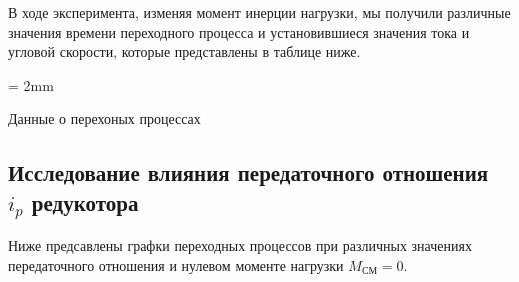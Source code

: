 \documentclass[a4paper, 12pt]{article}
\begin{document}
	\newpage
	В ходе эксперимента, изменяя момент инерции нагрузки, мы получили различные значения времени переходного процесса и установившиеся значения тока и угловой скорости, которые представлены в таблице ниже.
	
	\begin{table}[h!]
		\tabulinesep = 2mm
		\centering
		\begin{threeparttable}
			\caption{Данные о перехоных процессах }
		\end{threeparttable}
	\end{table}
	
	\newpage
	\begin{center}
		\section{Исследование влияния передаточного отношения $i_p$ редукотора}
	\end{center}
	\par Ниже предсавлены графки переходных процессов при различных значениях передаточного отношения и нулевом моменте нагрузки $M_\text{СМ} = 0$.
	
\end{document}

